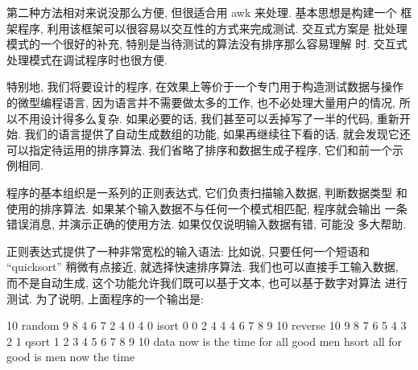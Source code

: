 第二种方法相对来说没那么方便, 但很适合用 awk 来处理. 基本思想是构建一个
框架程序, 利用该框架可以很容易以交互性的方式来完成测试. 交互式方案是
批处理模式的一个很好的补充, 特别是当待测试的算法没有排序那么容易理解
时. 交互式处理模式在调试程序时也很方便.

特别地, 我们将要设计的程序, 在效果上等价于一个专门用于构造测试数据与操作
的微型编程语言, 因为语言并不需要做太多的工作, 也不必处理大量用户的情况,
所以不用设计得多么复杂. 如果必要的话, 我们甚至可以丢掉写了一半的代码,
重新开始. 我们的语言提供了自动生成数组的功能, 如果再继续往下看的话, 
就会发现它还可以指定待运用的排序算法.
我们省略了排序和数据生成子程序, 它们和前一个示例相同.

程序的基本组织是一系列的正则表达式, 它们负责扫描输入数据, 判断数据类型
和使用的排序算法. 如果某个输入数据不与任何一个模式相匹配, 程序就会输出
一条错误消息, 并演示正确的使用方法. 如果仅仅说明输入数据有错, 可能没
多大帮助.

正则表达式提供了一种非常宽松的输入语法: 比如说, 只要任何一个短语和
``quicksort''
稍微有点接近, 就选择快速排序算法. 我们也可以直接手工输入数据,
而不是自动生成, 这个功能允许我们既可以基于文本, 也可以基于数字对算法
进行测试. 为了说明, 上面程序的一个输出是:
\begin{shell}
    10 random
     9 8 4 6 7 2 4 0 4 0
    isort
     0 0 2 4 4 4 6 7 8 9
    10 reverse
     10 9 8 7 6 5 4 3 2 1
    qsort
     1 2 3 4 5 6 7 8 9 10
    data now is the time for all good men
    hsort
     all for good is men now the time
\end{shell}

